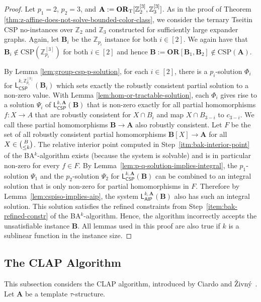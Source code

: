 \documentclass[a4paper,english, thm-restate]{lipics-v2021}
\newcommand{\ZZ}{\mathbb{Z}}
\newcommand{\sig}{\tau}
\newcommand{\StructA}{\mathbf{A}}
\newcommand{\StructB}{\mathbf{B}}
\newcommand{\CSP}[1]{\mathrm{CSP}(#1)}
\newcommand{\leqs}{\mathsf{L}}
\newcommand{\cspiso}[3]{\leqs^{#1,#2}_{\mathsf{CSP}}(#3)}
\newcommand{\aipk}[3]{\leqs^{#1,#2}_{\mathsf{AIP}} (#3)}
\newcommand{\CosetGrpTmplt}[2]{#1^{[#2]}}
\newcommand{\OR}[1]{\mathbf{OR}[#1]}
\begin{document}
	
	\BLPDoesNotSolveBoundedColorClass*
	\begin{proof}
		Let $p_1 = 2$, $p_2=3$, and $\StructA := \ZtwoOrThreeInst$.
		As in the proof of Theorem \ref{thm:z-affine-does-not-solve-bounded-color-class},
		we consider the ternary Tseitin CSP no-instances over $\ZZ_2$ and $\ZZ_3$
		constructed for sufficiently large expander graphs.
		Again, let $\StructB_i$ be the $\ZZ_{p_i}$ instance for both $i\in[2]$.
		We again have that $\StructB_i \not \in \CSP{\CosetGrpTmplt{\ZZ_{p_i}}{3}}$
		for both $i\in[2]$ and hence $\StructB := \OR{\StructB_1,\StructB_2} \notin \CSP{\StructA}$.
		
		By Lemma \ref{lem:group-csp-p-solution}, for each $i \in [2]$, there is a $p_i$-solution $\Phi_i$ for $\cspiso{k}{\CosetGrpTmplt{\ZZ_{p_i}}{3}}{\StructB_i}$ 
		which sets exactly the robustly consistent partial solution to a non-zero value. With Lemma \ref{lem:hom-or-tractable-solution}, each $\Phi_i$ gives rise to a solution
		$\Psi_i$ of $\cspiso{k}{\StructA}{\StructB}$ that is non-zero exactly for all partial homomorphisms $f\colon X \to A$ that are robustly consistent for $X \cap B_i$ and map $X \cap B_{3-i}$ to $c_{3-i}$.
		We call these partial homomorphisms $\StructB\to\StructA$ also robustly consistent.
		Let $F$ be the set of all robustly consistent partial homomorphisms  $\StructB[X]\to\StructA$ for all $X\in \tbinom{B}{\leq k}$.
		The relative interior point computed in Step~\ref{itm:bak-interior-point} of the BA$^k$-algorithm exists (because the system is solvable)
		and is in particular non-zero for every $f \in F$.
		By Lemma~\ref{lem:p-q-solution-implies-integral},
		the  $p_1$-solution $\Psi_1$ and the $p_2$-solution $\Psi_2$ for $\cspiso{k}{\StructA}{\StructB}$ can be combined to an integral solution that is only non-zero for partial homomorphisms in $F$.
		Therefore by Lemma~\ref{lem:cspiso-implies-aip},
		the system $\aipk{k}{\StructA}{\StructB}$ also has such an integral solution.
		This solution satisfies the refined constraints from
		Step~\ref{item:bak-refined-constr} of the BA$^k$-algorithm.
		Hence, the algorithm incorrectly accepts the unsatisfiable instance $\StructB$. All lemmas used in this proof are also true if $k$ is a sublinear function in the instance size.
	\end{proof}
	
	
	\subsection{The CLAP Algorithm}
	\label{app:CLAP}
	This subsection considers the CLAP algorithm, introduced by Ciardo and Živný~\cite{CiardoZivny2023CLAP}.
	Let $\StructA$ be a template $\sig$-structure.
	
\end{document}
